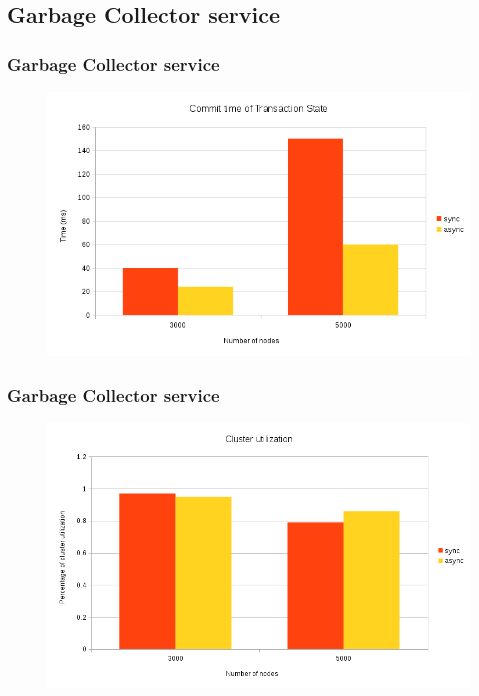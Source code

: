 \documentclass{beamer}
\begin{document}
\subsection{Garbage Collector service}
\begin{frame}
\frametitle{Garbage Collector service}
\begin{figure}
\centering
  \includegraphics[scale=0.5]{resources/async_commit_time.png}
\end{figure}
\end{frame}

\begin{frame}
\frametitle{Garbage Collector service}
\begin{figure}
\centering
  \includegraphics[scale=0.5]{resources/async_cluster_util.png}
\end{figure}
\end{frame}
\end{document}
